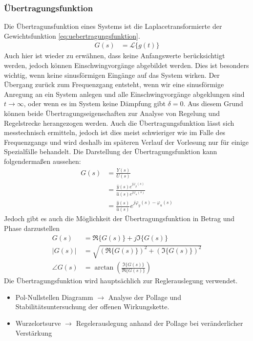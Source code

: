\subsubsection{Übertragungsfunktion}
%
Die Übertragunsfunktion eines Systems ist die Laplacetransformierte der Gewichtsfunktion \eqref{eq:uebertragungsfunktion}.
%
\begin{equation}
\begin{aligned}
G(s)&=\mathcal{L}\{g(t)\}\label{eq:uebertragungsfunktion}
\end{aligned}
\end{equation}
%
Auch hier ist wieder zu erwähnen, dass keine Anfangswerte berücksichtigt werden, jedoch können Einschwingvorgänge abgebildet werden. Dies ist besonders wichtig, wenn keine sinusförmigen Eingänge auf das System wirken. Der Übergang zurück zum Frequenzgang entsteht, wenn wir eine sinusförmige Anregung an ein System anlegen und alle Einschwingvorgänge abgeklungen sind $t\rightarrow\infty$, oder wenn es im System keine Dämpfung gibt $\delta=0$. 
%
Aus diesem Grund können beide Übertragungseigenschaften zur Analyse von Regelung und Regelstrecke herangezogen werden. Auch die Übertragungsfunktion lässt sich messtechnisch ermitteln, jedoch ist dies meist schwieriger wie im Falle des Frequenzgangs und wird deshalb im späteren Verlauf der Vorlesung nur für einige Spezialfälle behandelt. Die Darstellung der Übertragungsfunktion kann folgendermaßen aussehen: 
%
\begin{equation*}
\begin{aligned}
G(s)&=\frac{Y(s)}{U(s)}\\
&=\frac{\hat{y}(s)e^{j\varphi_{y}(s)}}{\hat{u}(s)e^{j\varphi_{u}(s)}}\\
&=\frac{\hat{y}(s)}{\hat{u}(s)}e^{j\varphi_{y}(s)-\varphi_{u}(s)}
\end{aligned}
\end{equation*}
%
Jedoch gibt es auch die Möglichkeit der Übertragungsfunktion in Betrag und Phase darzustellen
%
\begin{equation*}
\begin{aligned}
G(s)&=\Re\{G(s)\}+j\Im\{G(s)\}\\
\left|G(s)\right|&=\sqrt{\left(\Re\{G(s)\}\right)^{2}+\left(\Im\{G(s)\}\right)^{2}}\\
\angle G(s)&=\arctan\left(\frac{\Im\{G(s)\}}{\Re\{G(s)\}}\right)
\end{aligned}
\end{equation*}
%
Die Übertragungsfunktion wird hauptsächlich zur Reglerauslegung verwendet.
%
\begin{itemize}
	\item Pol-Nullstellen Diagramm $\rightarrow$ Analyse der Pollage und Stabilitätsuntersuchung der offenen Wirkungskette.
	\item Wurzelortsurve $\rightarrow$ Regelerauslegung anhand der Pollage bei veränderlicher Verstärkung
\end{itemize}
%
